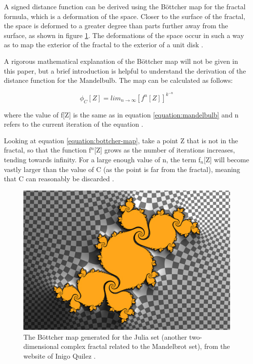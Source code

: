 A signed distance function can be derived using the B\"{o}ttcher map for the fractal formula, which is a deformation of the space. Closer to the surface of the fractal, the space is deformed to a greater degree than parts further away from the surface, as shown in figure \ref{figure:julia-bottcher-map}. The deformations of the space occur in such a way as to map the exterior of the fractal to the exterior of a unit disk \cite{quilez-distance}.\newline

A rigorous mathematical explanation of the B\"{o}ttcher map will not be given in this paper, but a brief introduction is helpful to understand the derivation of the distance function for the Mandelbulb. The map can be calculated as follows:

\begin{equation} \label{equation:bottcher-map}
	{\phi_C[Z]} = {lim_{n\rightarrow\infty}[f^n[Z]]^{k^{-n}}}
\end{equation}

where the value of f[Z] is the same as in equation \ref{equation:mandelbulb} and n refers to the current iteration of the equation \cite{marrs2021ray}.\newline

Looking at equation \ref{equation:bottcher-map}, take a point Z that is not in the fractal, so that the function f$^n$[Z] grows as the number of iterations increases, tending towards infinity. For a large enough value of n, the term f$_n$[Z] will become vastly larger than the value of C (as the point is far from the fractal), meaning that C can reasonably be discarded \cite{marrs2021ray}.

\begin{figure} [ht]
	\centering
	\includegraphics[width=0.5\linewidth, frame]{Images/Quilez-Bottcher-Map.jpg}
	\caption{The B\"{o}ttcher map generated for the Julia set (another two-dimensional complex fractal related to the Mandelbrot set), from the website of Inigo Quilez \cite{quilez-distance}.}
	\label{figure:julia-bottcher-map}
\end{figure}

